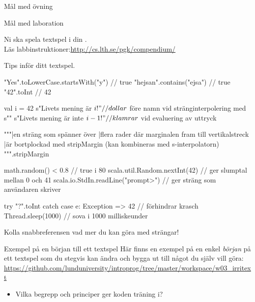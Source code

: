 \ifkompendium\else
{}

\begin{SlideExtra}{Mål med övning \ExeWeekTHREE}
\begin{itemize}\SlideFontSmall
  
\end{itemize}
\end{SlideExtra}

\begin{SlideExtra}{Mål med laboration \LabWeekTHREE}
\begin{itemize}
  
\end{itemize}
Ni ska spela  textspel i din .\\
Läs labbinstruktioner:\url{http://cs.lth.se/pgk/compendium/}
\end{SlideExtra}


\begin{SlideExtra}{Tips inför ditt textspel.}
\begin{Code}
"Yes".toLowerCase.startsWith("y")    // true
"hejsan".contains("ejsa")            // true
"42".toInt                           // 42

val i = 42
s"Livets mening är $i!" // dollar $ före namn vid stränginterpolering med s""
s"Livets mening är inte ${i-1}!"  // klamrar ${} vid evaluering av uttryck

"""|en sträng som spänner över
   |flera rader där marginalen fram till vertikalstreck
   |är bortplockad med stripMargin (kan kombineras med s-interpolatorn)
""".stripMargin

math.random() < 0.8                  // true i 80%
scala.util.Random.nextInt(42)      // ger slumptal mellan 0 och 41
scala.io.StdIn.readLine("prompt>") // ger sträng som användaren skriver

try { "?".toInt } catch { case e: Exception => 42 }  // förhindrar krasch
Thread.sleep(1000)    // sova i 1000 milliskeunder
\end{Code}
Kolla snabbreferensen vad mer du kan göra med strängar!
\end{SlideExtra}

\begin{SlideExtra}{Exempel på en början till ett textspel}
  Här finns en exempel på en enkel \emph{början} på ett textspel som du stegvis kan ändra och bygga ut till något du själv vill göra:
  \url{https://github.com/lunduniversity/introprog/tree/master/workspace/w03_irritext}

\begin{itemize}
  \item Vilka begrepp och principer ger koden träning i?
\end{itemize}

\end{SlideExtra}

